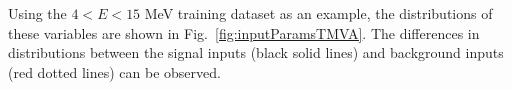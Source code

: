 Using the $4<E<15$ MeV training dataset as an example, the distributions of these variables are shown in Fig.~\ref{fig:inputParamsTMVA}. The differences in distributions between the signal inputs (black solid lines) and background inputs (red dotted lines) can be observed.

\begin{figure}[htbp]
	\centering
	\subfigure[$Z_{factor}$]{
}
\end{figure}
